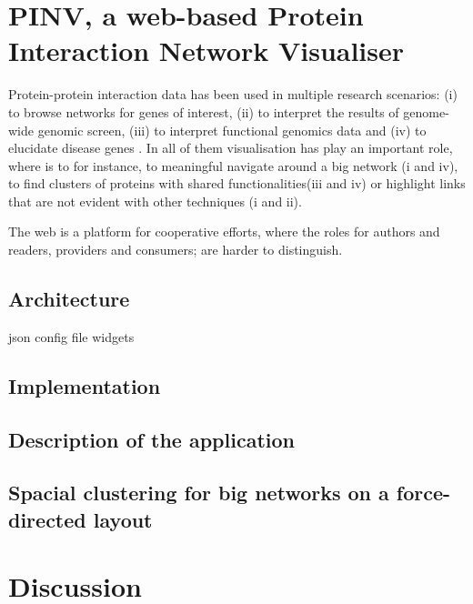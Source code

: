 \section{PINV, a web-based Protein Interaction Network Visualiser }  \label{section:pinv}
Protein-protein interaction data has been used in multiple research scenarios: (i) to browse networks for genes of interest, (ii) to interpret the results of genome-wide genomic screen, (iii) to interpret functional genomics data and (iv) to elucidate disease genes \cite{FRA2013}. In all of them visualisation has play an important role, where is to for instance,  to meaningful navigate around a big network (i and iv), to find clusters of proteins with shared functionalities(iii and iv)  or highlight links that are not evident with other techniques (i and ii).

The web is a platform for cooperative efforts, where the roles for authors and readers, providers and consumers; are harder to distinguish.

\subsection{Architecture}
json config file
widgets

\subsection{Implementation}
\subsection{Description of the application}

\subsection{Spacial clustering for big networks on a force-directed layout}

\section{Discussion}


